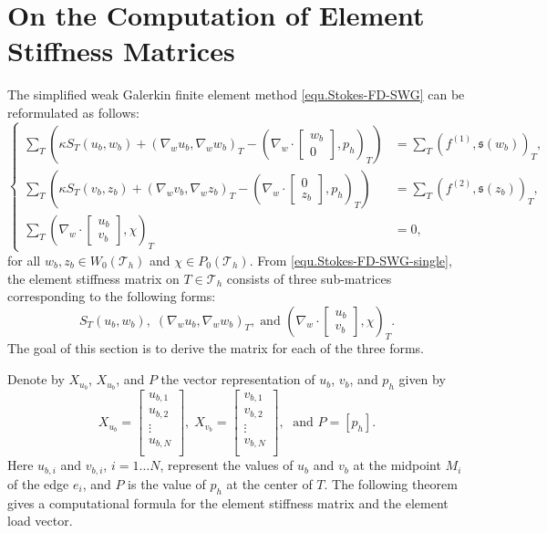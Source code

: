 \documentclass[final,leqno]{siamltex704}
\def\S{{\mathfrak s}}
\def\T{{\mathcal T}}
\begin{document}
\section{On the Computation of Element Stiffness Matrices}\label{Section:stiffnessmatrix}
The simplified weak Galerkin finite element method \eqref{equ.Stokes-FD-SWG} can be reformulated as follows:
\begin{equation}\label{equ.Stokes-FD-SWG-single}
\left\{
\begin{array}{rl}
\displaystyle \sum_{T} \left( \kappa S_T(u_b,w_b) + (\nabla_w u_b, \nabla_w w_b )_T - (\nabla_w\cdot \begin{bmatrix}w_b\\0 \end{bmatrix} ,p_h)_T\right)&=\displaystyle\sum_{T}( f^{(1)}, \S(w_b))_T,\\
\displaystyle\sum_{T}\left( \kappa S_T(v_b,z_b) + (\nabla_w v_b, \nabla_w z_b )_T -(\nabla_w\cdot \begin{bmatrix}0\\z_b \end{bmatrix},p_h)_T\right)&=\displaystyle\sum_{T}( f^{(2)}, \S(z_b))_T,\\
\displaystyle\sum_{T}(\nabla_w\cdot \begin{bmatrix}u_b\\v_b \end{bmatrix},\chi)_T&=0,
\end{array}
\right.
\end{equation}
for all $w_b, z_b\in W_0(\T_h)$ and $\chi\in P_0(\T_h)$. From \eqref{equ.Stokes-FD-SWG-single}, the element stiffness matrix on $T\in\T_h$ consists of three sub-matrices corresponding to the following forms:
$$
S_T(u_b,w_b),\; (\nabla_w u_b, \nabla_w w_b )_T,\; \text{and }
(\nabla_w\cdot \begin{bmatrix}u_b\\v_b \end{bmatrix},\chi)_T.
$$
The goal of this section is to derive the matrix for each of the three forms.

Denote by
$X_{{u}_b}$, $X_{{u}_b}$, and $P$ the vector representation of $u_b$, $v_b$, and $p_h$ given by
\begin{equation*}
X_{{u}_b}
=
\begin{bmatrix}
u_{b,1} \\
u_{b,2} \\
\vdots  \\
u_{b,N} \\
\end{bmatrix},\;
X_{{v}_b}
=
\begin{bmatrix}
v_{b,1} \\
v_{b,2} \\
\vdots  \\
v_{b,N} \\
\end{bmatrix},\;\text{ and } P=[p_h].
\end{equation*}
Here $u_{b,i}$ and $v_{b,i}$, $i=1\ldots N$, represent the values of $u_b$ and $v_b$ at the midpoint $M_i$ of the edge $e_i$, and $P$ is the value of $p_h$ at the center of $T$. The following theorem gives a computational formula for the element stiffness matrix and the element load vector.
\end{document}
